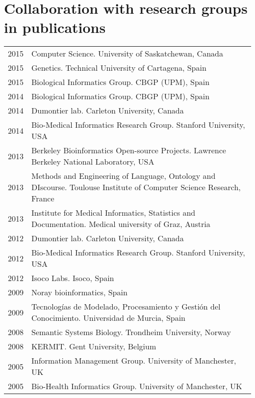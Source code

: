 \documentclass[11pt,fullpage]{article}
\begin{document}
\section*{Collaboration with research groups in publications}

\begin{longtable}{p{0.5in}|p{5.5in}}


2015 & Computer Science. University of Saskatchewan, Canada \\
2015 & Genetics. Technical University of Cartagena, Spain \\
2015 & Biological Informatics Group. CBGP (UPM), Spain \\
2014 & Biological Informatics Group. CBGP (UPM), Spain \\
2014 & Dumontier lab. Carleton University, Canada \\
2014 & Bio-Medical Informatics Research Group. Stanford University, USA \\
2013 & Berkeley Bioinformatics Open-source Projects. Lawrence Berkeley National Laboratory, USA \\
2013 & Methods and Engineering of Language, Ontology and DIscourse. Toulouse Institute of Computer Science Research, France \\
2013 & Institute for Medical Informatics, Statistics and Documentation. Medical university of Graz, Austria \\
2012 & Dumontier lab. Carleton University, Canada \\
2012 & Bio-Medical Informatics Research Group. Stanford University, USA \\
2012 & Isoco Labs. Isoco, Spain \\
2009 & Noray bioinformatics, Spain \\
2009 & Tecnolog\'ias de Modelado, Procesamiento y Gesti\'on del Conocimiento. Universidad de Murcia, Spain \\
2008 & Semantic Systems Biology. Trondheim University, Norway \\
2008 & KERMIT. Gent University, Belgium \\
2005 & Information Management Group. University of Manchester, UK \\
2005 & Bio-Health Informatics Group. University of Manchester, UK \\

\end{longtable}
\end{document}

